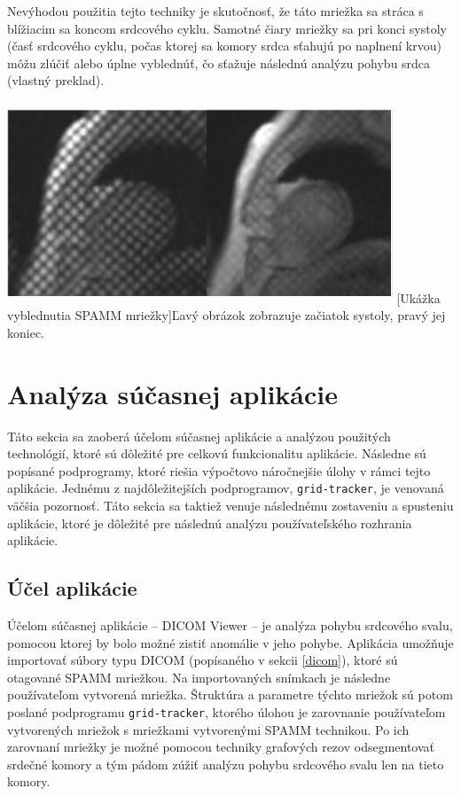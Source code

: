 Nevýhodou použitia tejto techniky je skutočnosť, že táto mriežka sa stráca s blížiacim sa koncom srdcového cyklu. Samotné čiary mriežky sa pri konci systoly (časť srdcového cyklu, počas ktorej sa komory srdca sťahujú po naplnení krvou) môžu zlúčiť alebo úplne vyblednúť, čo sťažuje následnú analýzu pohybu srdca \cite{spamm_description} (vlastný preklad).

\begin {center}
        \centering
        \includegraphics[width=11.5cm, height=6cm]{media/heart/early_late_systole.png}
        \captionsetup{justification=centering}
        [Ukážka vyblednutia SPAMM mriežky]{Ľavý obrázok zobrazuje začiatok systoly, pravý jej koniec.}
\end {center}

\chapter {Analýza súčasnej aplikácie}

Táto sekcia sa zaoberá účelom súčasnej aplikácie a analýzou použitých technológií, ktoré sú dôležité pre celkovú funkcionalitu aplikácie. Následne sú popísané podprogramy, ktoré riešia výpočtovo náročnejšie úlohy v rámci tejto aplikácie. Jednému z najdôležitejších podprogramov, \texttt{grid-tracker}, je venovaná väčšia pozornosť. Táto sekcia sa taktiež venuje následnému zostaveniu a spusteniu aplikácie, ktoré je dôležité pre následnú analýzu používateľského rozhrania aplikácie.

\section {Účel aplikácie}

Účelom súčasnej aplikácie -- DICOM Viewer -- je analýza pohybu srdcového svalu, pomocou ktorej by bolo možné zistiť anomálie v jeho pohybe. Aplikácia umožňuje importovať súbory typu DICOM (popísaného v sekcii \ref{dicom}), ktoré sú otagované SPAMM mriežkou. Na importovaných snímkach je následne používateľom vytvorená mriežka. Štruktúra a parametre týchto mriežok sú potom poslané podprogramu \texttt{grid-tracker}, ktorého úlohou je zarovnanie používateľom vytvorených mriežok s mriežkami vytvorenými SPAMM technikou. Po ich zarovnaní mriežky je možné pomocou techniky grafových rezov odsegmentovať srdečné komory a tým pádom zúžiť analýzu pohybu srdcového svalu len na tieto komory.

